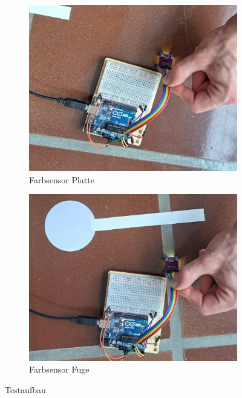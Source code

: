 \documentclass[../main.tex]{subfiles}
\begin{document}
\begin{figure}[H]
    \vspace{0.5cm}

    \begin{subfigure}{0.3\textwidth}
        \centering
        \includegraphics[width=\linewidth]{img/sensortest/Farbsensor_Platte.jpg}
        \caption{Farbsensor Platte}
        \label{fig:FarbsensorPlatte}
    \end{subfigure}
    \begin{subfigure}{0.3\textwidth}
        \centering
        \includegraphics[width=\linewidth]{img/sensortest/Farbsensor_Fuge.jpg}
        \caption{Farbsensor Fuge}
        \label{fig:FarbsensorFuge}
    \end{subfigure}

    \caption{Testaufbau}
    \label{fig:Testanordnungen}
\end{figure}
\end{document}
